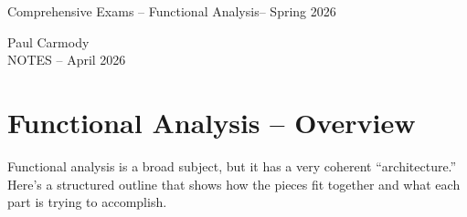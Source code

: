 \documentclass[12pt,a4paper]{report}
\newcommand{\CLASSNAME}{Comprehensive Exams -- Functional Analysis}
\newcommand{\STUDENTNAME}{Paul Carmody}
\newcommand{\ASSIGNMENT}{NOTES }
\newcommand{\DUEDATE}{April 2026}
\newcommand{\SEMESTER}{Spring 2026}
\begin{document}
\begin{center}
	\Large{\CLASSNAME -- \SEMESTER} 
\end{center}
\begin{center}
	\STUDENTNAME \\
	\ASSIGNMENT -- \DUEDATE\\
\end{center} 

\section*{Functional Analysis -- Overview}

Functional analysis is a broad subject, but it has a very coherent “architecture.” Here’s a structured outline that shows how the pieces fit together and what each part is trying to accomplish.
\end{document}
